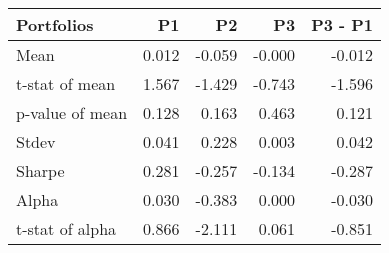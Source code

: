 \begin{tabular}{lrrrr}
\toprule
Portfolios & P1 & P2 & P3 & P3 - P1 \\
\midrule
Mean & 0.012 & -0.059 & -0.000 & -0.012 \\
t-stat of mean & 1.567 & -1.429 & -0.743 & -1.596 \\
p-value of mean & 0.128 & 0.163 & 0.463 & 0.121 \\
Stdev & 0.041 & 0.228 & 0.003 & 0.042 \\
Sharpe & 0.281 & -0.257 & -0.134 & -0.287 \\
Alpha & 0.030 & -0.383 & 0.000 & -0.030 \\
t-stat of alpha & 0.866 & -2.111 & 0.061 & -0.851 \\
\bottomrule
\end{tabular}
